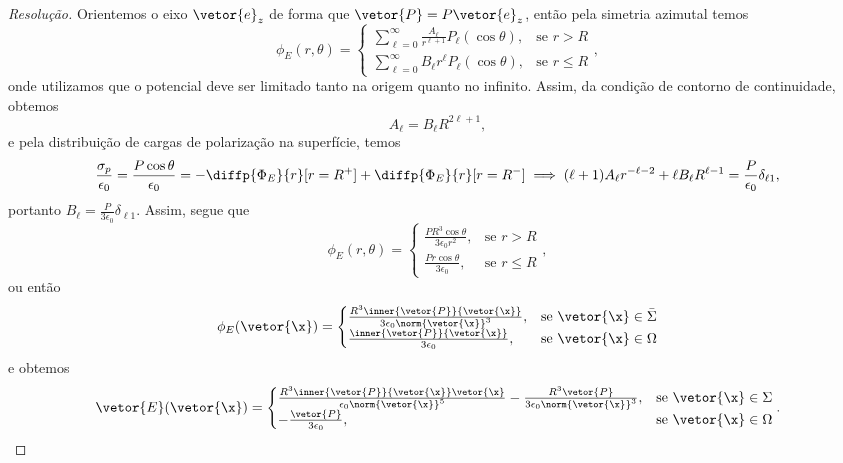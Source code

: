 \begin{proof}[Resolução]
    Orientemos o eixo \(\vetor{e}_z\) de forma que \(\vetor{P} = P \vetor{e}_z\), então pela simetria azimutal temos
    \begin{equation*}
        \phi_E(r, \theta) = \begin{cases}
            \sum_{\ell = 0}^\infty \frac{A_\ell}{r^{\ell + 1}} P_\ell(\cos\theta),&\text{se }r > R\\
            \sum_{\ell = 0}^\infty B_\ell r^\ell P_\ell (\cos\theta),&\text{se }r \leq R
        \end{cases},
    \end{equation*}
    onde utilizamos que o potencial deve ser limitado tanto na origem quanto no infinito. Assim, da condição de contorno de continuidade, obtemos
    \begin{equation*}
        A_\ell = B_\ell R^{2\ell + 1},
    \end{equation*}
    e pela distribuição de cargas de polarização na superfície, temos
    \begin{equation*}
        \frac{\sigma_p}{\epsilon_0} = \frac{P \cos\theta}{\epsilon_0} = - \diffp{\Phi_E}{r}[r= R^+] + \diffp{\Phi_E}{r}[r = R^-] \implies (\ell + 1) A_\ell r^{- \ell - 2} + \ell B_\ell R^{\ell - 1} = \frac{P}{\epsilon_0} \delta_{\ell 1},
    \end{equation*}
    portanto \( B_{\ell} = \frac{P}{3\epsilon_0} \delta_{\ell 1} \). Assim, segue que
    \begin{equation*}
        \phi_E(r, \theta) = \begin{cases}
            \frac{P R^3 \cos\theta}{3\epsilon_0 r^2},&\text{se }r > R\\
            \frac{P r \cos\theta}{3\epsilon_0},&\text{se }r \leq R
        \end{cases},
    \end{equation*}
    ou então
    \begin{equation*}
        \phi_E(\vetor{\x}) = \begin{cases}
            \frac{R^3\inner{\vetor{P}}{\vetor{\x}}}{3 \epsilon_0 \norm{\vetor{\x}}^3},&\text{se } \vetor{\x} \in \bar{\Sigma}\\
            \frac{\inner{\vetor{P}}{\vetor{\x}}}{3 \epsilon_0},&\text{se } \vetor{\x} \in \Omega
        \end{cases}
    \end{equation*}
    e obtemos
    \begin{equation*}
        \vetor{E}(\vetor{\x}) = \begin{cases}
            \frac{R^3\inner{\vetor{P}}{\vetor{\x}}\vetor{\x}}{\epsilon_0 \norm{\vetor{\x}}^5} - \frac{R^3\vetor{P}}{3 \epsilon_0 \norm{\vetor{\x}}^3},&\text{se }\vetor{\x} \in \Sigma\\
            -\frac{\vetor{P}}{3 \epsilon_0},&\text{se } \vetor{\x} \in \Omega
        \end{cases}.
    \end{equation*}


\end{proof}
